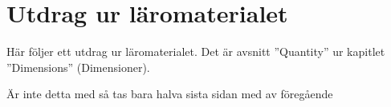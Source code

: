 \chapter{Utdrag ur läromaterialet}
\label{cha:utdrag}

Här följer ett utdrag ur läromaterialet. Det är avsnitt ''Quantity'' ur kapitlet ''Dimensions'' (Dimensioner).



\newpage

Är inte detta med så tas bara halva sista sidan med av föregående

